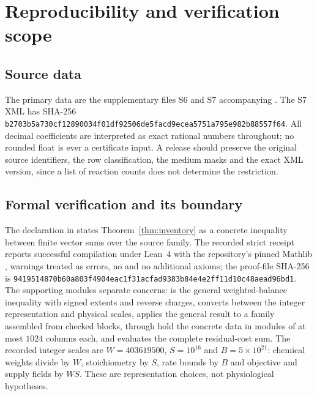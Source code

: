 \documentclass[11pt,a4paper]{article}
\newcommand{\hashfour}[4]{\texttt{#1\allowbreak#2\allowbreak#3\allowbreak#4}}
\theoremstyle{plain}
\theoremstyle{definition}
\theoremstyle{remark}
\begin{document}
\appendix

\section{Reproducibility and verification scope}\label{app:repro}

\subsection*{Source data}
The primary data are the supplementary files S6 and S7 accompanying
\citet{haiman2025}. The S7 XML has SHA-256
\hashfour{b2703b5a730cf128}{90034f01df92506d}{e5facd9ecea5751a}{795e982b88557f64}. All
decimal coefficients are interpreted as exact rational numbers throughout; no
rounded float is ever a certificate input. A release should preserve the
original source identifiers, the row classification, the medium masks and the
exact XML version, since a list of reaction counts does not determine the
restriction.

\subsection*{Formal verification and its boundary}
The declaration
 in
 states Theorem~\ref{thm:inventory}
as a concrete inequality between finite vector sums over the source family. The
recorded strict receipt reports successful compilation under Lean~4
\citep{moura2021} with the repository's pinned Mathlib \citep{mathlib2020},
warnings treated as errors, no  and no additional axioms; the
proof-file SHA-256 is
\hashfour{9419514870b60a80}{3f4904eac1f31acf}{ad9383b84e4e2ff1}{1d10c48aead96bd1}. The
supporting modules separate concerns: 
is the general weighted-balance inequality with signed extents and reverse
charges,  converts between the integer representation and
physical scales,  applies the general
result to a family assembled from checked blocks,  through
 hold the concrete data in modules of at most $1024$ columns each,
and  evaluates the complete residual-cost
sum. The recorded integer scales are $W=403619500$, $S=10^{16}$ and
$B=5\times10^{21}$: chemical weights divide by $W$, stoichiometry by $S$, rate
bounds by $B$ and objective and supply fields by $WS$. These are
representation choices, not physiological hypotheses.
\end{document}
